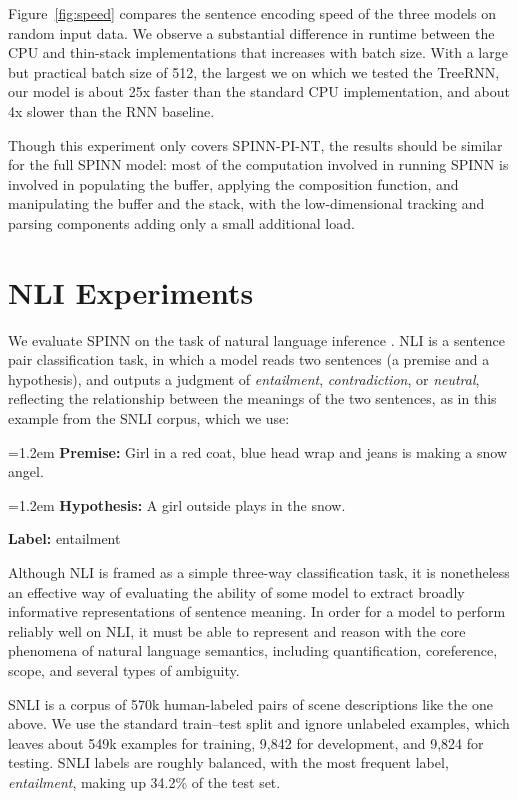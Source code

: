 \documentclass[11pt]{article}
\newcommand{\snli}[3]{{\vspace{0.25em}
{\small \setlength{\parindent}{0.6em} \hangindent=1.2em  \textbf{Premise:} #1\par}\vspace{0.25em}
{\small \setlength{\parindent}{0.6em} \hangindent=1.2em   \textbf{Hypothesis:} #2\par}\vspace{0.25em}
{\small \setlength{\parindent}{0.6em}  \textbf{Label:} #3\par}
}}
\begin{document}
Figure~\ref{fig:speed} compares the sentence encoding speed of the three models on random input data. We observe a substantial difference in runtime between the CPU and thin-stack implementations that increases with batch size. With a large but practical batch size of 512, the largest we on which we tested the TreeRNN, our model is about 25x faster than the standard CPU implementation, and about 4x slower than the RNN baseline.

Though this experiment only covers SPINN-PI-NT, the results should be similar for the full SPINN model: most of the computation involved in running SPINN is involved in populating the buffer, applying the composition function, and manipulating the buffer and the stack, with the low-dimensional tracking and parsing components adding only a small additional load.

\section{NLI Experiments}

We evaluate SPINN on the task of natural language inference \citep[NLI, a.k.a.\ recognizing textual entailment, or RTE;][]{dagan2006pascal}. NLI is a sentence pair classification task, in which a model reads two sentences (a premise and a hypothesis), and outputs a judgment of {\it entailment}, {\it contradiction}, or {\it neutral}, reflecting the relationship between the meanings of the two sentences, as in this example from the SNLI corpus, which we use: 

\snli{Girl in a red coat, blue head wrap and jeans is making a snow angel.}
{A girl outside plays in the snow.}
{entailment}

Although NLI is framed as a simple three-way classification task, it is nonetheless an effective way of evaluating the ability of some model to extract broadly informative representations of sentence meaning. In order for a model to perform reliably well on NLI, it must be able to represent and reason with the core phenomena of natural language semantics, including quantification, coreference, scope, and several types of ambiguity.

SNLI is a corpus of 570k human-labeled pairs of scene descriptions like the one above. We use the standard train--test split and ignore unlabeled examples, which leaves about 549k examples for training, 9,842 for development, and 9,824 for testing. SNLI labels are roughly balanced, with the most frequent label, {\it entailment}, making up 34.2\% of the test set.
\end{document}
